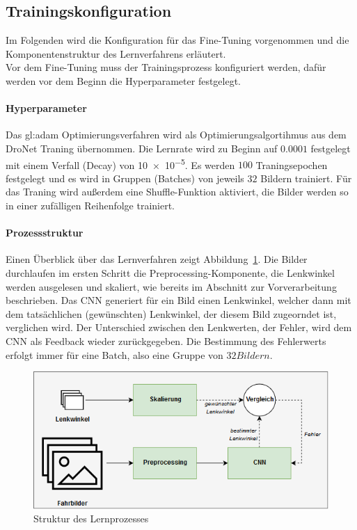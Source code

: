 \subsection{Trainingskonfiguration}
Im Folgenden wird die Konfiguration für das Fine-Tuning vorgenommen und die Komponentenstruktur des Lernverfahrens erläutert.\\
Vor dem Fine-Tuning muss der Trainingsprozess konfiguriert werden, dafür werden vor dem Beginn die Hyperparameter festgelegt.

\paragraph{Hyperparameter}
Das \gls{gl:adam} Optimierungsverfahren \cite{kingma2014adam} wird als Optimierungsalgortihmus aus dem DroNet Traning übernommen.
Die Lernrate wird zu Beginn auf $0.0001$ festgelegt mit einem Verfall (Decay) von \num{10e-5}. Es werden $100$ Traningsepochen festgelegt und es wird in Gruppen (Batches) von jeweils $32$ Bildern trainiert. Für das Traning wird außerdem eine Shuffle-Funktion aktiviert, die Bilder werden so in einer zufälligen Reihenfolge trainiert.

\paragraph{Prozessstruktur}
Einen Überblick über das Lernverfahren zeigt Abbildung~\ref{img:lernarchitektur}. Die Bilder durchlaufen im ersten Schritt die Preprocessing-Komponente, die Lenkwinkel werden ausgelesen und skaliert, wie bereits im Abschnitt zur Vorverarbeitung beschrieben. Das CNN generiert für ein Bild einen Lenkwinkel, welcher dann mit dem tatsächlichen (gewünschten) Lenkwinkel, der diesem Bild zugeorndet ist, verglichen wird. Der Unterschied zwischen den Lenkwerten, der Fehler, wird dem CNN als Feedback wieder zurückgegeben. Die Bestimmung des Fehlerwerts erfolgt immer für eine Batch, also eine Gruppe von $32 Bildern$. 

\begin{figure}[h]
	\centering
	\includegraphics[width=\linewidth]{figures/Lernarchitektur.png}
	\caption{Struktur des Lernprozesses}
	\label{img:lernarchitektur}
\end{figure}

